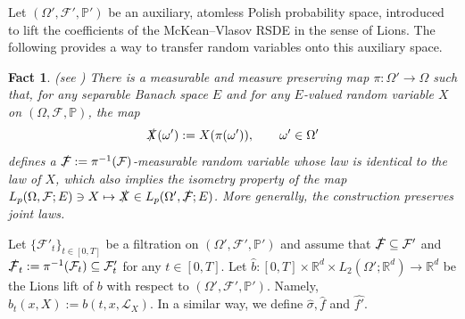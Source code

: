 \documentclass[10pt, a4paper]{article} %
\newcommand{\R}{\mathbb{R}}
\theoremstyle{definition}
\theoremstyle{plain}
\newtheorem{lemma}[defn]{Lemma}
\newtheorem*{fact}{Fact}
\begin{document}
{
Let $(\Omega',\mathcal{F}',\mathbb{P}')$ be  an auxiliary, atomless Polish probability space, introduced to lift the coefficients of the McKean--Vlasov RSDE in the sense of Lions.
The following provides a way to transfer random variables onto this auxiliary space. 
}
\begin{fact} \label{fact}
    (see \cite[Appendix A.1]{FHL25})
    There is a measurable and measure preserving map $\pi : \Omega' \to \Omega$ such that, for any separable Banach space $E$ and for any $E$-valued random variable $X$ on $(\Omega,\mathcal{F},\mathbb{P})$, the map \begin{equation*}
        \slashed{X}(\omega') := X(\pi(\omega')), \qquad \omega' \in \Omega'
    \end{equation*}
    defines a $\slashed{\mathcal{F}}:= \pi^{-1}(\mathcal{F})$-measurable random variable whose law is identical to the law of $X$, which also implies the isometry property of the map $L_p(\Omega,\mathcal{F};E) \ni X \mapsto \slashed{X} \in L_p(\Omega',\slashed{\mathcal{F}};E)$.
    More generally, the construction preserves joint laws. 
\end{fact}

\noindent Let $\{\mathcal{F}'_t\}_{t \in [0,T]}$ be a filtration on $(\Omega',\mathcal{F}',\mathbb{P}')$ and assume that $\slashed{\mathcal{F}} \subseteq \mathcal{F}'$ and $\slashed{\mathcal{F}}_t := \pi^{-1}(\mathcal{F}_t) \subseteq \mathcal{F}'_t$ for any $t \in [0,T]$. 
Let $\hat{b}: [0,T] \times \R^d \times L_2(\Omega';\R^d) \to \R^d$ be the Lions lift of $b$ with respect to $(\Omega',\mathcal{F}',\mathbb{P}')$. Namely, $\hat{b}_t(x,X) := b(t, x,\mathcal{L}_X)$. In a similar way, we define $\hat{\sigma}, \hat{f}$ and $\hat{f'}$. 
\end{document}
